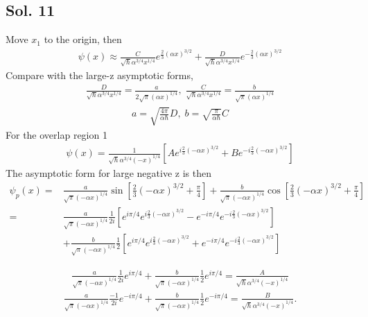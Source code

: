 \subsection*{Sol. 11}
Move $x_1$ to the origin, then
\begin{align*}
    \psi(x)\approx 
    \frac{C}{\sqrt{\hbar}\alpha^{3/4}x^{1/4}}
    e^{\frac{2}{3}(\alpha x)^{3/2}} + \frac{D}{\sqrt{\hbar}\alpha^{3/4}x^{1/4}}
    e^{-\frac{2}{3}(\alpha x)^{3/2}}
\end{align*}
Compare with the large-z asymptotic forms,
\begin{align*}
    \frac{D}{\sqrt{\hbar}\alpha^{3/4}x^{1/4}}=\frac{a}{2\sqrt{\pi}(\alpha x)^{1/4}},\;
    \frac{C}{\sqrt{\hbar}\alpha^{3/4}x^{1/4}}=\frac{b}{\sqrt{\pi}(\alpha x)^{1/4}}
\end{align*}
\begin{align*}
    a =
    \sqrt{\frac{4\pi}{\alpha\hbar}}D
    , \;
    b =
    \sqrt{\frac{\pi}{\alpha\hbar}}C
\end{align*}
For the overlap region 1
\begin{align*}
    \psi(x) = 
    \frac{1}{\sqrt{\hbar}\alpha^{3/4}(-x)^{1/4}}
    [Ae^{i\frac{2}{3}(-\alpha x)^{3/2}}+
    Be^{-i\frac{2}{3}(-\alpha x)^{3/2}}]
\end{align*}
The asymptotic form for large negative z is then 
\begin{align*}
    \psi_p(x)=&
    \frac{a}{\sqrt{\pi}(-\alpha x)^{1/4}}\sin\left[
    \frac{2}{3}(-\alpha x)^{3/2}+\frac{\pi}{4}
    \right]
    +
    \frac{b}{\sqrt{\pi}(-\alpha x)^{1/4}}\cos\left[
    \frac{2}{3}(-\alpha x)^{3/2}+\frac{\pi}{4}
    \right]\\
    =&
    \frac{a}{\sqrt{\pi}(-\alpha x)^{1/4}}
    \frac{1}{2i}[
    e^{i\pi/4}e^{i\frac{2}{3}(-\alpha x)^{3/2}}
    -
    e^{-i\pi/4}e^{-i\frac{2}{3}(-\alpha x)^{3/2}}
    ]\\
    &+
    \frac{b}{\sqrt{\pi}(-\alpha x)^{1/4}}
    \frac{1}{2}[
    e^{i\pi/4}e^{i\frac{2}{3}(-\alpha x)^{3/2}}
    +
    e^{-i\pi/4}e^{-i\frac{2}{3}(-\alpha x)^{3/2}}
    ]
\end{align*}

\begin{align*}
    \frac{a}{\sqrt{\pi}(-\alpha x)^{1/4}}
    \frac{1}{2i}e^{i\pi /4}
    +
    \frac{b}{\sqrt{\pi}(-\alpha x)^{1/4}}
    \frac{1}{2}e^{i\pi /4}
    =\frac{A}{\sqrt{\hbar}\alpha^{3/4}(-x)^{1/4}}
\end{align*}
\begin{align*}
    \frac{a}{\sqrt{\pi}(-\alpha x)^{1/4}}
    \frac{-1}{2i}e^{-i\pi /4}
    +
    \frac{b}{\sqrt{\pi}(-\alpha x)^{1/4}}
    \frac{1}{2}e^{-i\pi /4}
    =\frac{B}{\sqrt{\hbar}\alpha^{3/4}(-x)^{1/4}}.
\end{align*}

